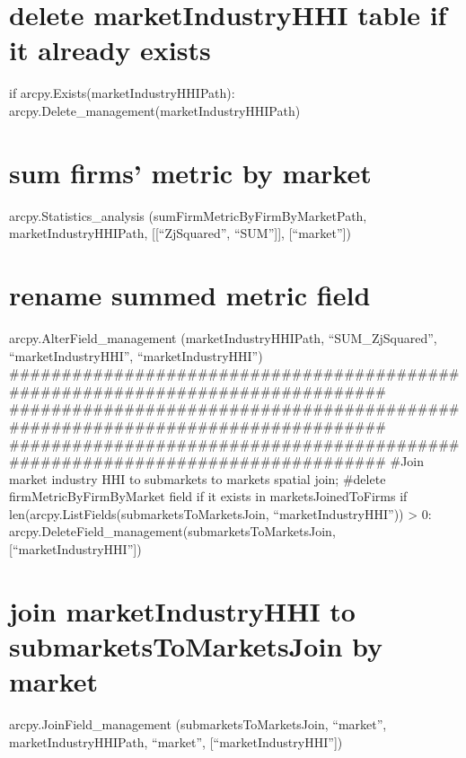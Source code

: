 \documentclass[]{article}
\begin{document}
\section{delete marketIndustryHHI table if it already
exists}\label{delete-marketindustryhhi-table-if-it-already-exists}

if arcpy.Exists(marketIndustryHHIPath):
arcpy.Delete\_management(marketIndustryHHIPath)

\section{sum firms' metric by
market}\label{sum-firms-metric-by-market-1}

arcpy.Statistics\_analysis (sumFirmMetricByFirmByMarketPath,
marketIndustryHHIPath, {[}{[}``ZjSquared'', ``SUM''{]}{]},
{[}``market''{]})

\section{rename summed metric field}\label{rename-summed-metric-field-2}

arcpy.AlterField\_management (marketIndustryHHIPath, ``SUM\_ZjSquared'',
``marketIndustryHHI'', ``marketIndustryHHI'')
\#\#\#\#\#\#\#\#\#\#\#\#\#\#\#\#\#\#\#\#\#\#\#\#\#\#\#\#\#\#\#\#\#\#\#\#\#\#\#\#\#\#\#\#\#\#\#\#\#\#\#\#\#\#\#\#\#\#\#\#\#\#\#\#\#\#\#\#\#\#\#\#\#\#\#\#\#\#\#
\#\#\#\#\#\#\#\#\#\#\#\#\#\#\#\#\#\#\#\#\#\#\#\#\#\#\#\#\#\#\#\#\#\#\#\#\#\#\#\#\#\#\#\#\#\#\#\#\#\#\#\#\#\#\#\#\#\#\#\#\#\#\#\#\#\#\#\#\#\#\#\#\#\#\#\#\#\#\#
\#\#\#\#\#\#\#\#\#\#\#\#\#\#\#\#\#\#\#\#\#\#\#\#\#\#\#\#\#\#\#\#\#\#\#\#\#\#\#\#\#\#\#\#\#\#\#\#\#\#\#\#\#\#\#\#\#\#\#\#\#\#\#\#\#\#\#\#\#\#\#\#\#\#\#\#\#\#\#
\#Join market industry HHI to submarkets to markets spatial join;
\#delete firmMetricByFirmByMarket field if it exists in
marketsJoinedToFirms if len(arcpy.ListFields(submarketsToMarketsJoin,
``marketIndustryHHI'')) \textgreater{} 0:
arcpy.DeleteField\_management(submarketsToMarketsJoin,{[}``marketIndustryHHI''{]})

\section{join marketIndustryHHI to submarketsToMarketsJoin by
market}\label{join-marketindustryhhi-to-submarketstomarketsjoin-by-market}

arcpy.JoinField\_management (submarketsToMarketsJoin, ``market'',
marketIndustryHHIPath, ``market'', {[}``marketIndustryHHI''{]})
\end{document}
